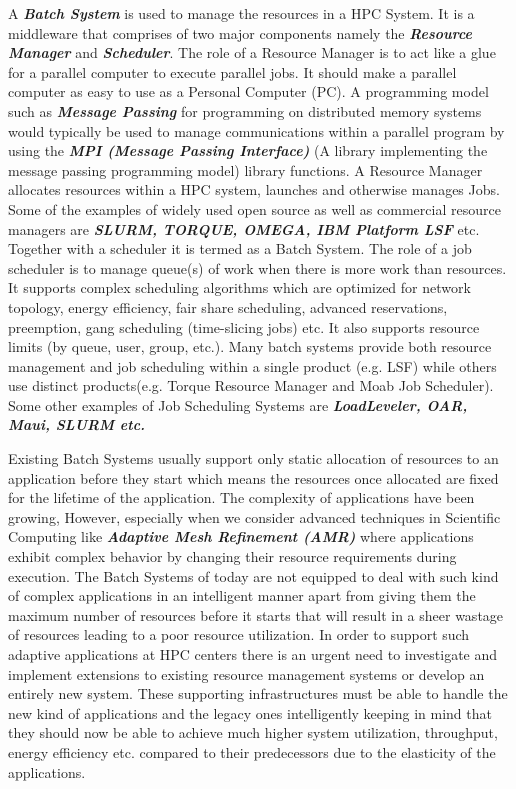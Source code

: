 A \textbf{\textit{Batch System}} is used to manage the resources in a HPC System. It is a middleware that comprises of two major components namely the \textbf{\textit{Resource Manager}} and \textbf{\textit{Scheduler}}. The role of a Resource Manager is to act like a glue for a parallel computer to execute parallel jobs. It should make a parallel computer as easy to use as a Personal Computer (PC). A programming model such as \textbf{\textit{Message Passing}} for programming on distributed memory systems would typically be used to manage communications within a parallel program by using the \textbf{\textit{MPI (Message Passing Interface)}} (A library implementing the message passing programming model) library functions. A Resource Manager allocates resources within a HPC system, launches and otherwise manages Jobs. Some of the examples of widely used open source as well as commercial resource managers are \textbf{\textit{SLURM, TORQUE, OMEGA, IBM Platform LSF}} etc. Together with a scheduler it is termed as a Batch System. The role of a job scheduler is to manage queue(s) of work when there is more work than resources. It supports complex scheduling algorithms which are optimized for network topology, energy efficiency, fair share scheduling, advanced reservations, preemption, gang scheduling (time-slicing jobs) etc. It also supports resource limits (by queue, user, group, etc.). Many batch systems provide both resource management and job scheduling within a single product (e.g. LSF) while others use distinct products(e.g. Torque Resource Manager and Moab Job Scheduler). Some other examples of Job Scheduling Systems are \textbf{\textit{LoadLeveler, OAR, Maui, SLURM etc.}}\\ \par
\noindent
Existing Batch Systems usually support only static allocation of resources to an application before they start which means the resources once allocated are fixed for the lifetime of the application. The complexity of applications have been growing, However, especially when we consider advanced techniques in Scientific Computing like \textbf{\textit{Adaptive Mesh Refinement (AMR)}}\cite{plewa} where applications exhibit complex behavior by changing their resource requirements during execution. The Batch Systems of today are not equipped to deal with such kind of complex applications in an intelligent manner apart from giving them the maximum number of resources before it starts that will result in a sheer wastage of resources leading to a poor resource utilization. In order to support such adaptive  applications at HPC centers there is an urgent need to investigate and implement extensions to existing resource management systems or develop an entirely new system. These supporting infrastructures must be able to handle the new kind of applications and the legacy ones intelligently keeping in mind that they should now be able to achieve much higher system utilization, throughput, energy efficiency etc. compared to their predecessors due to the elasticity of the applications.

